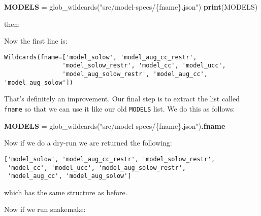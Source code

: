 \documentclass[]{book}
\newenvironment{Shaded}{\begin{snugshade}}{\end{snugshade}}
\newcommand{\KeywordTok}[1]{\textcolor[rgb]{0.13,0.29,0.53}{\textbf{{#1}}}}
\newcommand{\StringTok}[1]{\textcolor[rgb]{0.31,0.60,0.02}{{#1}}}
\newcommand{\NormalTok}[1]{{#1}}
\theoremstyle{definition}
\theoremstyle{definition}
\theoremstyle{definition}
\theoremstyle{remark}
\begin{document}
\begin{Shaded}
\begin{Highlighting}[]
\KeywordTok{MODELS} \NormalTok{= glob_wildcards(}\StringTok{"src/model-specs/\{fname\}.json"}\NormalTok{)}
\KeywordTok{print}\NormalTok{(MODELS)}
\end{Highlighting}
\end{Shaded}

then:

\begin{Shaded}
\end{Shaded}

Now the first line is:

\begin{verbatim}
Wildcards(fname=['model_solow', 'model_aug_cc_restr',
                'model_solow_restr', 'model_cc', 'model_ucc',
                'model_aug_solow_restr', 'model_aug_cc', 'model_aug_solow'])
\end{verbatim}

That's definitely an improvement. Our final step is to extract the list
called \texttt{fname} so that we can use it like our old \texttt{MODELS}
list. We do this as follows:

\begin{Shaded}
\begin{Highlighting}[]
\KeywordTok{MODELS} \NormalTok{= glob_wildcards(}\StringTok{"src/model-specs/\{fname\}.json"}\NormalTok{)}\KeywordTok{.fname}
\end{Highlighting}
\end{Shaded}

Now if we do a dry-run we are returned the following:

\begin{verbatim}
['model_solow', 'model_aug_cc_restr', 'model_solow_restr',
 'model_cc', 'model_ucc', 'model_aug_solow_restr',
 'model_aug_cc', 'model_aug_solow']
\end{verbatim}

which has the same structure as before.

Now if we run snakemake:

\begin{Shaded}
\end{Shaded}
\end{document}
